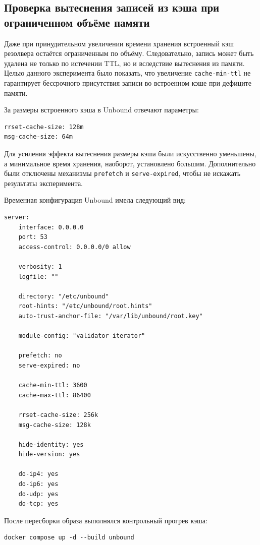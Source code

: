 \documentclass[a4paper,14pt]{extarticle}
\begin{document}
\subsection{Проверка вытеснения записей из кэша при ограниченном объёме памяти}
Даже при принудительном увеличении времени хранения встроенный кэш резолвера остаётся ограниченным по объёму. Следовательно, запись может быть удалена не только по истечении TTL, но и вследствие вытеснения из памяти. Целью данного эксперимента было показать, что увеличение \texttt{cache-min-ttl} не гарантирует бессрочного присутствия записи во встроенном кэше при дефиците памяти.

За размеры встроенного кэша в Unbound отвечают параметры:

\begin{lstlisting}
rrset-cache-size: 128m
msg-cache-size: 64m
\end{lstlisting}

Для усиления эффекта вытеснения размеры кэша были искусственно уменьшены, а минимальное время хранения, наоборот, установлено большим. Дополнительно были отключены механизмы \texttt{prefetch} и \texttt{serve-expired}, чтобы не искажать результаты эксперимента.

Временная конфигурация Unbound имела следующий вид:

\begin{lstlisting}
server:
    interface: 0.0.0.0
    port: 53
    access-control: 0.0.0.0/0 allow

    verbosity: 1
    logfile: ""

    directory: "/etc/unbound"
    root-hints: "/etc/unbound/root.hints"
    auto-trust-anchor-file: "/var/lib/unbound/root.key"

    module-config: "validator iterator"

    prefetch: no
    serve-expired: no

    cache-min-ttl: 3600
    cache-max-ttl: 86400

    rrset-cache-size: 256k
    msg-cache-size: 128k

    hide-identity: yes
    hide-version: yes

    do-ip4: yes
    do-ip6: yes
    do-udp: yes
    do-tcp: yes
\end{lstlisting}

После пересборки образа выполнялся контрольный прогрев кэша:

\begin{lstlisting}
docker compose up -d --build unbound
\end{lstlisting}
\end{document}
